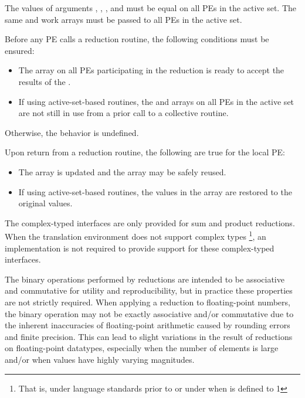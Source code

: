\begin{apidefinition}
{\begin{DeprecateBlock}
    The values of arguments , , ,
    and  must be equal on all \acp{PE} in the active set.
    The same  and  work arrays must be passed to all
    \acp{PE} in the active set.

    Before any \ac{PE} calls a reduction routine, the following conditions must be ensured:
    \begin{itemize}
    \item The \dest{} array on all \acp{PE} participating in the reduction
      is ready to accept the results of the .
    \item If using active-set-based routines, the
       and  arrays on all \acp{PE} in the
      active set are not still in use from a prior call to a collective
      \openshmem routine.
    \end{itemize}
    Otherwise, the behavior is undefined.
    
    Upon return from a reduction routine, the following are true for the local
    \ac{PE}:
    \begin{itemize}
    \item The \dest{} array is updated and the \source{} array may be safely reused.
    \item If using active-set-based routines,
    the values in the  array are restored to the original values.
    \end{itemize}
\end{DeprecateBlock}

    The complex-typed interfaces are only provided for sum and product reductions.
    When the \Cstd translation environment does not support complex types
    \footnote{That is, under \Cstd language standards prior to \Cstd[99] or under \Cstd[11]
    when  is defined to 1}, an \openshmem
    implementation is not required to provide support for these
    complex-typed interfaces.

    The binary operations performed by \openshmem reductions are intended to be
    associative and commutative for utility and reproducibility, but in
    practice these properties are not strictly required.
    When applying a reduction to floating-point numbers, the binary operation
    may not be exactly associative and/or commutative due to the inherent
    inaccuracies of floating-point arithmetic caused by rounding errors and
    finite precision.
    This can lead to slight variations in the result of \openshmem reductions
    on floating-point datatypes, especially when the number of elements is
    large and/or when values have highly varying magnitudes.
}


\end{apidefinition}

